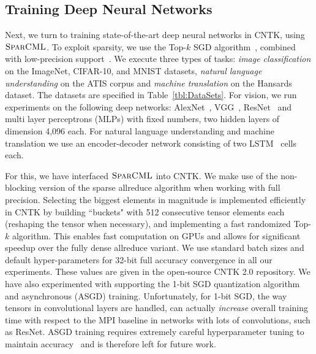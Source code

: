 \documentclass[11pt]{article}
\newcommand{\mml}{$\textsc{SparCML}$}
\begin{document}
\subsection{Training Deep Neural Networks}

Next, we turn to training state-of-the-art deep neural networks in CNTK, using \mml{}.  
To exploit sparsity, we use the Top-$k$ SGD algorithm~\cite{dryden2016communication, sun2017meprop, aji2017sparse}, combined with low-precision support~\cite{alistarh2016qsgd}. 
We execute three types of tasks: \emph{image classification} on the
ImageNet, CIFAR-10, and MNIST datasets, \emph{natural language
	understanding} on the ATIS corpus and \emph{machine translation} on the
Hansards dataset. The datasets are specified in
Table~\ref{tbl:DataSets}. For vision, we run experiments on the
following deep networks: AlexNet~\cite{AlexNet},
VGG~\cite{simonyan2014very}, ResNet~\cite{he2016deep} and multi layer
perceptrons (MLPs) with fixed numbers, two hidden layers of dimension 4,096 each. For natural language understanding and machine translation we use an encoder-decoder network consisting of two LSTM~\cite{hochreiter1997long} cells each. 

For this, we have interfaced \mml{} into CNTK. We make use of the
non-blocking version of the sparse allreduce algorithm when working with
full precision. Selecting the biggest elements in magnitude is
implemented efficiently in CNTK by building ``buckets" with 512
consecutive tensor elements each (reshaping the tensor when necessary),
and implementing a fast randomized Top-$k$ algorithm. This enables fast
computation on GPUs and allows for significant speedup over the fully
dense allreduce variant.
We use standard batch sizes and default hyper-parameters for 32-bit full accuracy convergence in all our experiments. These values are given in the open-source CNTK 2.0 repository. We have also experimented with supporting the 1-bit SGD quantization algorithm~\cite{seide20141} and asynchronous (ASGD) training. Unfortunately, for 1-bit SGD, the way tensors in convolutional layers are handled, can actually \emph{increase} overall training time with respect to the MPI baseline in networks with lots of convolutions, such as ResNet. ASGD training requires extremely careful hyperparameter tuning to maintain accuracy~\cite{zhang2017yellowfin} and is therefore left for future work.
\end{document}
